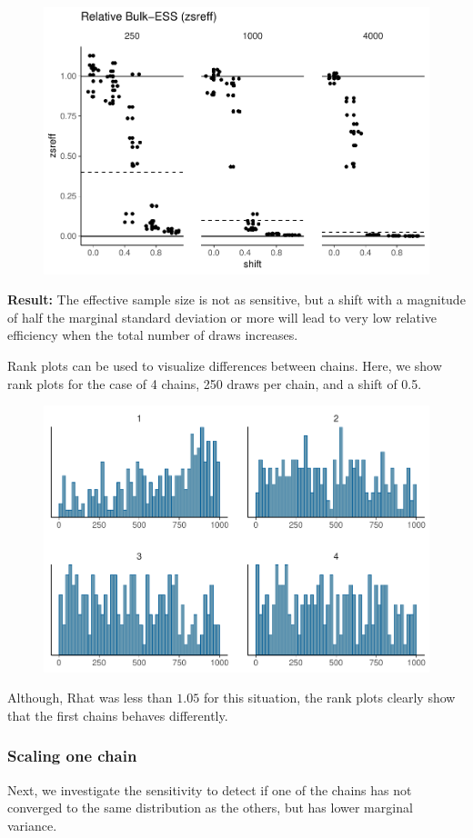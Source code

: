 \documentclass[american,]{article}
\begin{document}
\begin{figure}[t]
  \centering
  \includegraphics[width=0.6\linewidth]{graphics/zsreff-shifted-chain-1.pdf}
\end{figure}

\textbf{Result:} The effective sample size is not as sensitive, but a
shift with a magnitude of half the marginal standard deviation or more
will lead to very low relative efficiency when the total number of draws
increases.

Rank plots can be used to visualize differences between chains. Here, we
show rank plots for the case of 4 chains, 250 draws per chain, and a
shift of 0.5.

\begin{figure}[t]
  \centering
  \includegraphics[width=0.6\linewidth]{graphics/hist-shifted-chain-1.pdf}
\end{figure}

Although, Rhat was less than \(1.05\) for this situation, the rank plots
clearly show that the first chains behaves differently.

\hypertarget{scaling-one-chain}{%
\subsubsection*{Scaling one chain}\label{scaling-one-chain}}

Next, we investigate the sensitivity to detect if one of the chains has
not converged to the same distribution as the others, but has lower
marginal variance.
\end{document}
